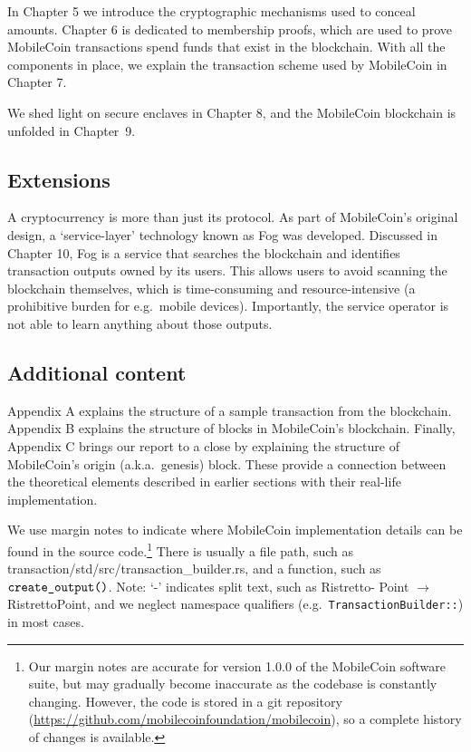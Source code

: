 In Chapter 5 we introduce the cryptographic mechanisms used to conceal amounts. Chapter 6 is dedicated to membership proofs, which are used to prove MobileCoin transactions spend funds that exist in the blockchain. With all the components in place, we explain the transaction scheme used by MobileCoin in Chapter 7.%

We shed light on secure enclaves in Chapter 8, and the MobileCoin blockchain is unfolded in Chapter~9.%


\subsection{Extensions}

A cryptocurrency is more than just its protocol. As part of MobileCoin's original design, a `service-layer' technology known as Fog was developed. Discussed in Chapter 10, Fog is a service that searches the blockchain and identifies transaction outputs owned by its users. This allows users to avoid scanning the blockchain themselves, which is time-consuming and resource-intensive (a prohibitive burden for e.g.\ mobile devices). Importantly, the service operator is not able to learn anything about those outputs.%


\subsection{Additional content}
Appendix A explains the structure of a sample transaction from the blockchain. Appendix B explains the structure of blocks in MobileCoin's blockchain. Finally, Appendix C brings our report to a close by explaining the structure of MobileCoin's origin (a.k.a.\ genesis) block. These provide a connection between the theoretical elements described in earlier sections with their real-life implementation.

We use margin notes to indicate where MobileCoin implementation details can be found in the source code.\footnote{Our margin notes are accurate for version 1.0.0 of the MobileCoin software suite, but may gradually become inaccurate as the codebase is constantly changing. However, the code is stored in a git repository (\url{https://github.com/mobilecoinfoundation/mobilecoin}), so a complete history of changes is available.} There is usually a file path, such as transaction/std/src/transaction\_builder.rs, and a function, such as \(\textrm{{\tt create\_output()}}\). Note: `-' indicates split text, such as Ristretto- Point $\rightarrow$ RistrettoPoint, and we neglect namespace qualifiers (e.g.\ {\tt TransactionBuilder::}) in most cases.

